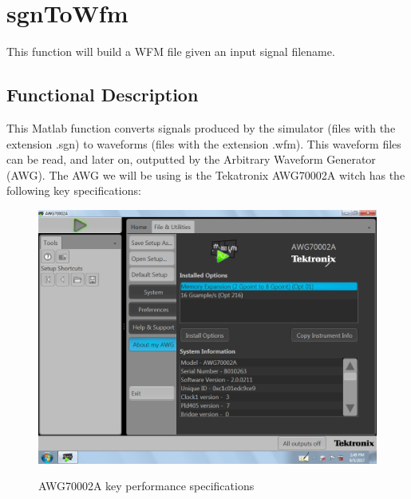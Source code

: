 \clearpage

\section{sgnToWfm}

This function will build a WFM file given an input signal filename.

  
%


\subsection*{Functional Description}

This Matlab function converts signals produced by the simulator (files with the extension .sgn) to waveforms  (files with the extension .wfm). This waveform files can be read, and later on, outputted by the Arbitrary Waveform Generator (AWG).
The AWG we will be using is the Tekatronix AWG70002A witch has the following key specifications:
\begin{figure}[h]
	\centering
	\includegraphics[width=\textwidth]{../mtools/sgnToWfm/figures/specs}
	\label{TUT_CompBad}\caption{AWG70002A key performance specifications}
\end{figure}
\bigskip


